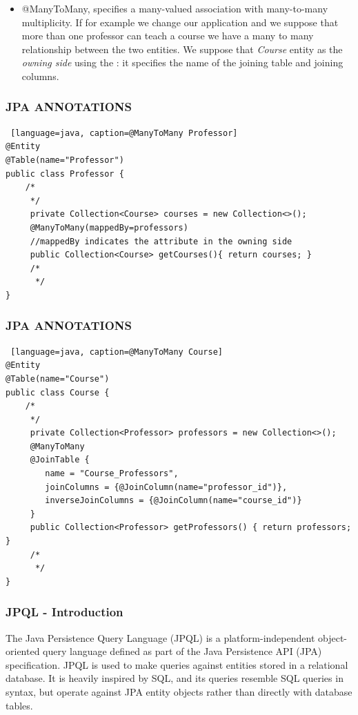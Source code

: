 \documentclass{beamer}
\begin{document}
\begin{frame} [fragile]
\begin{itemize}
\frametitle{JPA ANNOTATIONS}
\item @ManyToMany, specifies a many-valued association with many-to-many multiplicity.  If for example we change our application and we suppose that more than one professor can teach a course we have a many to many relationship between the two entities. We suppose that \textit{Course} entity as the \textit{owning side} using the : it specifies the name of the joining table and joining columns.
\end{itemize}
\end{frame}

\begin{frame} [fragile]
\frametitle{JPA ANNOTATIONS}
\begin{lstlisting} [language=java, caption=@ManyToMany Professor]
@Entity
@Table(name="Professor")
public class Professor {
	/*
	 */
	 private Collection<Course> courses = new Collection<>();
	 @ManyToMany(mappedBy=professors)
	 //mappedBy indicates the attribute in the owning side
	 public Collection<Course> getCourses(){ return courses; }
	 /*
	  */
}
\end{lstlisting}
\end{frame}

\begin{frame} [fragile]
\frametitle{JPA ANNOTATIONS}
\begin{lstlisting} [language=java, caption=@ManyToMany Course]
@Entity
@Table(name="Course")
public class Course {
	/*
	 */
	 private Collection<Professor> professors = new Collection<>();
	 @ManyToMany
	 @JoinTable {
	 	name = "Course_Professors",
	 	joinColumns = {@JoinColumn(name="professor_id")},
	 	inverseJoinColumns = {@JoinColumn(name="course_id")}
	 }
	 public Collection<Professor> getProfessors() { return professors; }
	 /*
	  */
}
\end{lstlisting}
\end{frame}

\begin{frame}
	\frametitle{JPQL - Introduction}
	The Java Persistence Query Language (JPQL) is a platform-independent object-oriented query language defined as part of the Java Persistence API (JPA) specification.
	\linebreak
	\linebreak
	JPQL is used to make queries against entities stored in a relational database. It is heavily inspired by SQL, and its queries resemble SQL queries in syntax, but operate against JPA entity objects rather than directly with database tables.
\end{frame}
\end{document}
